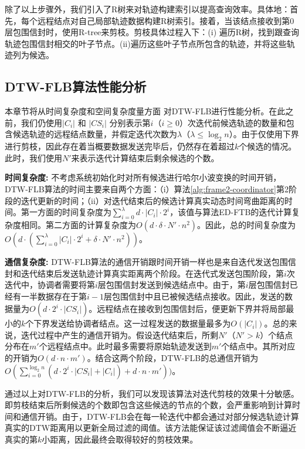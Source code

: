 除了以上步骤外，我们引入了R树来对轨迹构建索引以提高查询效率。具体地：首先，每个远程结点对自己局部轨迹数据构建R树索引。接着，当该结点接收到第$0$层包围信封时，使用R-tree来剪枝。剪枝具体过程入下：(i) 遍历R树，找到跟查询轨迹包围信封相交的叶子节点。(ii)遍历这些叶子节点所包含的轨迹，并将这些轨迹列为候选。


 \subsection{DTW-FLB算法性能分析}
 本章节将从时间复杂度和空间复杂度量方面 对DTW-FLB进行性能分析。在此之前，我们仍使用$|C_{i}|$ 和 $|CS_{i}|$ 分别表示第$i$（$i\ge 0$）次迭代前候选轨迹的数量和包含候选轨迹的远程结点数量，并假定迭代次数为$\lambda$（$\lambda \le \log_{2}n$）。由于仅使用下界进行剪枝，因此存在着当概要数据发送完毕后，仍然存在着超过$k$个候选的情况。此时，我们使用$N'$来表示迭代计算结束后剩余候选的个数。
 
 \textbf{时间复杂度:}
 不考虑系统初始化时对所有候选进行哈尔小波变换的时间开销，DTW-FLB算法的时间主要来自两个方面：（i）算法\ref{alg:frame2-coordinator}第2阶段的迭代更新的时间；（ii）对迭代结束后的候选计算真实动态时间弯曲距离的时间。第一方面的时间复杂度为$ \sum_{i=0}^{\lambda}d\cdot |C_{i}| \cdot 2^{i} $，该值与算法ED-FTB的迭代计算复杂度相同。第二方面的计算复杂度为$O(d \cdot \delta \cdot  N' \cdot n^2)$。因此，总的时间复杂度为$O(d \cdot ( \sum_{i=0}^{\lambda}  |C_{i}| \cdot 2^{i}+\delta  \cdot N' \cdot n^2))$。
 
 \textbf{通信复杂度:}
DTW-FLB算法的通信开销跟时间开销一样也是来自迭代发送包围信封和迭代结束后发送轨迹计算真实距离两个阶段。在迭代式发送包围阶段，第$i$次迭代中，协调者需要将第$i$层包围信封发送到候选结点中。由于，第$i$层包围信封已经有一半数据存在于第$i-1$层包围信封中且已被候选结点接收。因此，发送的数据量为$O(d\cdot 2^{i} \cdot |CS_{i}|)$。远程结点在接收到包围信封后，便更新下界并将局部最小的$k$个下界发送给协调者结点。这一过程发送的数据量最多为$O(|C_{i}|)$。总的来说，迭代过程中产生的通信开销为。假设迭代结束后，所剩$N'$（$N'>k$）个结点分布在$m'$个远程结点中。此时最多需要将原始轨迹发送到$m'$个结点中。其所对应的开销为$O(d\cdot n\cdot m')$。结合这两个阶段，DTW-FLB的总通信开销为$O(\sum_{i=0}^{\log_{2}n}(d\cdot 2^{i} \cdot |CS_{i}| + |C_{i}|)+d\cdot n\cdot m'))$。

通过以上对DTW-FLB的分析，我们可以发现该算法对迭代剪枝的效果十分敏感。即剪枝结束后所剩候选的个数即包含这些候选的节点的个数，会严重影响到计算时间和通信开销。由于，DTW-FLB会在每一轮迭代中都会通过对部分候选轨迹计算真实的DTW距离用以更新全局过滤的阈值。该方法能保证该过滤阈值会不断逼近真实的第$k$小距离，因此最终会取得较好的剪枝效果。
 

